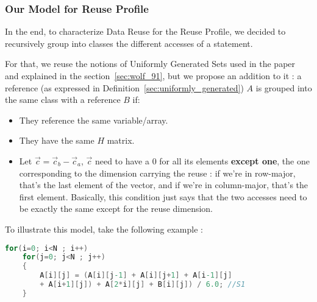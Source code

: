 \documentclass[paper=a4, fontsize=11.5pt]{scrartcl}
\numberwithin{equation}{section}        %
\numberwithin{figure}{section}          %
\numberwithin{table}{section}               %
\begin{document}

        \subsubsection{Our Model for Reuse Profile}
            In the end, to characterize Data Reuse for the Reuse Profile, we decided to
            recursively group into classes the different accesses of a statement.

            For that, we reuse the notions of Uniformly Generated Sets used in the paper~\cite{Wolf'91}
            and explained in the section~\ref{sec:wolf_91}, but we propose an addition to it :
            a reference (as expressed in Definition~\ref{sec:uniformly_generated}) $A$ is 
            grouped into the same class with a reference $B$ if:
            \begin{itemize}
                \item They reference the same variable/array.
                \item They have the same $H$ matrix.
                \item Let $\vec{c}=\vec{c}_b - \vec{c}_a$, $\vec{c}$ need to have a $0$
                    for all its elements \textbf{except one}, the one corresponding
                    to the dimension carrying the reuse : if we're in row-major, that's the
                    last element of the vector, and if we're in column-major, that's the first
                    element. Basically, this condition just says that the two accesses need
                    to be exactly the same except for the reuse dimension.
            \end{itemize}

            \bigskip

            To illustrate this model, take the following example :

\begin{lstlisting}[frame=single, language=C, caption=Reuse Profiling Example, label={lst:rp_example_0}]
for(i=0; i<N ; i++)
    for(j=0; j<N ; j++)
    {
        A[i][j] = (A[i][j-1] + A[i][j+1] + A[i-1][j]
        + A[i+1][j]) + A[2*i][j] + B[i][j]) / 6.0; //S1
    }
\end{lstlisting}
\end{document}
